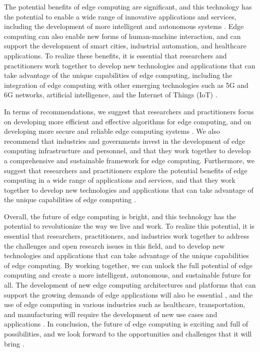 \documentclass[11pt]{article}
\begin{document}
The potential benefits of edge computing are significant, and this technology has the potential to enable a wide range of innovative applications and services, including the development of more intelligent and autonomous systems \cite{ref14}. Edge computing can also enable new forms of human-machine interaction, and can support the development of smart cities, industrial automation, and healthcare applications. To realize these benefits, it is essential that researchers and practitioners work together to develop new technologies and applications that can take advantage of the unique capabilities of edge computing, including the integration of edge computing with other emerging technologies such as 5G and 6G networks, artificial intelligence, and the Internet of Things (IoT) \cite{ref136}.

In terms of recommendations, we suggest that researchers and practitioners focus on developing more efficient and effective algorithms for edge computing, and on developing more secure and reliable edge computing systems \cite{ref84}. We also recommend that industries and governments invest in the development of edge computing infrastructure and personnel, and that they work together to develop a comprehensive and sustainable framework for edge computing. Furthermore, we suggest that researchers and practitioners explore the potential benefits of edge computing in a wide range of applications and services, and that they work together to develop new technologies and applications that can take advantage of the unique capabilities of edge computing \cite{ref17}.

Overall, the future of edge computing is bright, and this technology has the potential to revolutionize the way we live and work. To realize this potential, it is essential that researchers, practitioners, and industries work together to address the challenges and open research issues in this field, and to develop new technologies and applications that can take advantage of the unique capabilities of edge computing. By working together, we can unlock the full potential of edge computing and create a more intelligent, autonomous, and sustainable future for all. The development of new edge computing architectures and platforms that can support the growing demands of edge applications will also be essential \cite{ref161}, and the use of edge computing in various industries such as healthcare, transportation, and manufacturing will require the development of new use cases and applications \cite{ref48}. In conclusion, the future of edge computing is exciting and full of possibilities, and we look forward to the opportunities and challenges that it will bring \cite{ref19}.
\end{document}
